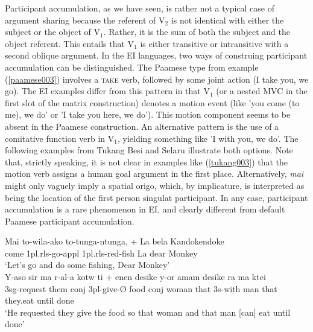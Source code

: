 Participant accumulation, as we have seen, is rather not a typical case of argument sharing because the referent of V$_2$ is not identical with either the subject or the object of V$_1$. Rather, it is the sum of both the subject and the object referent. This entails that V$_1$ is either transitive or intransitive with a second oblique argument. In the EI languages, two ways of construing participant accumulation can be distinguished. The Paamese type from example (\ref{paamese003}) involves a \textsc{take} verb, followed by some joint action (I take you, we go). The EI examples differ from this pattern in that V$_1$ (or a nested MVC in the first slot of the matrix construction) denotes a motion event (like 'you come (to me), we do' or 'I take you here, we do'). This motion component seems to be absent in the Paamese construction. An alternative pattern is the use of a comitative function verb in V$_1$, yielding something like 'I with you, we do'. The following examples from Tukang Besi and Selaru illustrate both options. Note that, strictly speaking, it is not clear in examples like (\ref{tukang003}) that the motion verb assigns a human goal argument in the first place. Alternatively, \textit{mai} might only vaguely imply a spatial origo, which, by implicature, is interpreted as being the location of the first person singulat participant. In any case, participant accumulation is a rare phenomenon in EI, and clearly different from default Paamese participant accumulation.

\ea \label{tukang003}
\gll Mai to-wila-ako to-tunga-ntunga, + La bela Kandokendoke \\
come 1\acs{pl}.\acs{rls}-go-\acs{appl} 1\acs{pl}.\acs{rls}-\acs{red}-fish La dear Monkey \\
\glft `Let's go and do some fishing, Dear Monkey' \\ 
\z
\xe
\ea \label{selaru001o}
\gll Y-aso sir ma r-al-a kotw ti + enen desike y-or amam desike ra ma ktei \\
3\acs{sg}-request them \acs{conj} 3\acs{pl}-give-Ø food \acs{conj} woman that 3s-with man that they.eat until done \\
\glft `He requested they give the food so that woman and that man [can] eat until done' \\ 
\z
\xe

